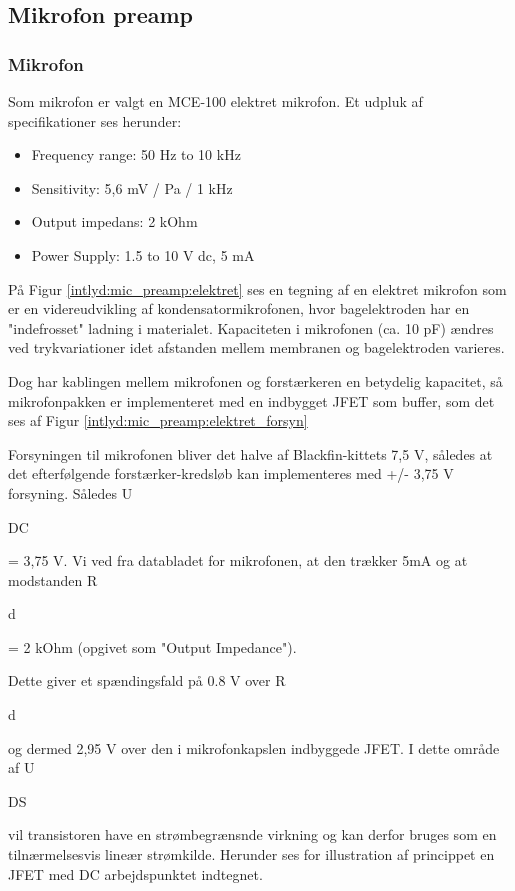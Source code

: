
\subsection{Mikrofon preamp}

\subsubsection{Mikrofon} 
Som mikrofon er valgt en MCE-100 elektret mikrofon. Et udpluk af specifikationer ses herunder:
\begin{itemize}
	\item Frequency range: 50 Hz to 10 kHz
	\item Sensitivity: 5,6 mV / Pa / 1 kHz
	\item Output impedans: 2 kOhm
	\item Power Supply: 1.5 to 10 V dc, 5 mA
\end{itemize}
 
På Figur \ref{intlyd:mic_preamp:elektret} ses en tegning af en elektret mikrofon som er en videreudvikling af kondensatormikrofonen, hvor bagelektroden har en "indefrosset" ladning i materialet. Kapaciteten i mikrofonen (ca. 10 pF) ændres ved trykvariationer idet afstanden mellem membranen og bagelektroden varieres. 


Dog har kablingen mellem mikrofonen og forstærkeren en betydelig kapacitet, så mikrofonpakken er implementeret med en indbygget JFET som buffer, som det ses af Figur \ref{intlyd:mic_preamp:elektret_forsyn}

Forsyningen til mikrofonen bliver det halve af Blackfin-kittets 7,5 V, således at det efterfølgende forstærker-kredsløb kan implementeres med +/- 3,75 V forsyning. Således U\begin{tiny}DC\end{tiny} = 3,75 V. 
Vi ved fra databladet for mikrofonen, at den trækker 5mA og at modstanden R\begin{tiny}d\end{tiny} = 2 kOhm (opgivet som "Output Impedance").

Dette giver et spændingsfald på 0.8 V over R\begin{tiny}d\end{tiny} og dermed 2,95 V over den i mikrofonkapslen indbyggede JFET. I dette område af U\begin{tiny}DS\end{tiny} vil transistoren have en strømbegrænsnde virkning og kan derfor bruges som en tilnærmelsesvis lineær strømkilde. Herunder ses for illustration af princippet en JFET med DC arbejdspunktet indtegnet.

